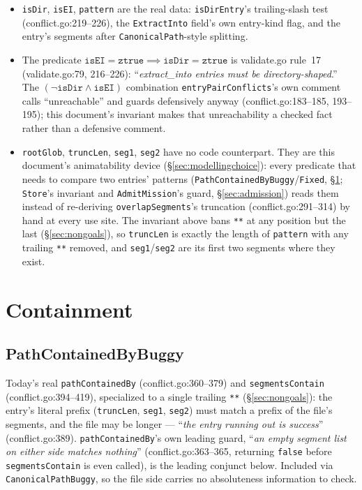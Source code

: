 \documentclass[a4paper,10pt,fleqn]{article}
\newcommand{\field}[1]{\texttt{#1}}
\begin{document}
\begin{itemize}
  \item \field{isDir}, \field{isEI}, \field{pattern} are the real
    data: \field{isDirEntry}'s trailing-slash test
    (conflict.go:219--226), the \field{ExtractInto} field's own
    entry-kind flag, and the entry's segments after
    \field{CanonicalPath}-style splitting.
  \item The predicate
    $\field{isEI} = \field{ztrue} \implies \field{isDir} = \field{ztrue}$ is
    validate.go rule~17 (validate.go:79, 216--226): ``\emph{extract\_into
    entries must be directory-shaped}.'' The
    $(\lnot\field{isDir} \land \field{isEI})$ combination
    \field{entryPairConflicts}'s own comment calls ``unreachable'' and
    guards defensively anyway (conflict.go:183--185, 193--195); this
    document's invariant makes that unreachability a checked fact
    rather than a defensive comment.
  \item \field{rootGlob}, \field{truncLen}, \field{seg1}, \field{seg2}
    have no code counterpart. They are this document's
    animatability device (\S\ref{sec:modellingchoice}): every
    predicate that needs to compare two entries' patterns
    (\field{PathContainedByBuggy}/\field{Fixed},
    \S\ref{sec:containment}; \field{Store}'s invariant and
    \field{AdmitMission}'s guard, \S\ref{sec:admission}) reads them
    instead of re-deriving \field{overlapSegments}'s truncation
    (conflict.go:291--314) by hand at every use site. The invariant
    above bans \texttt{**} at any position but the last
    (\S\ref{sec:nongoals}), so \field{truncLen} is exactly the length
    of \field{pattern} with any trailing \texttt{**} removed, and
    \field{seg1}/\field{seg2} are its first two segments where they
    exist.
\end{itemize}

\section{Containment}
\label{sec:containment}

\subsection{PathContainedByBuggy}

Today's real \field{pathContainedBy} (conflict.go:360--379) and
\field{segmentsContain} (conflict.go:394--419), specialized to a
single trailing \texttt{**} (\S\ref{sec:nongoals}): the entry's
literal prefix (\field{truncLen}, \field{seg1}, \field{seg2}) must
match a prefix of the file's segments, and the file may be longer
--- ``\emph{the entry running out is success}'' (conflict.go:389).
\field{pathContainedBy}'s own leading guard, ``\emph{an empty segment
list on either side matches nothing}'' (conflict.go:363--365,
returning \field{false} before \field{segmentsContain} is even
called), is the leading conjunct below. Included via
\field{CanonicalPathBuggy}, so the file side carries no absoluteness
information to check.
\end{document}
